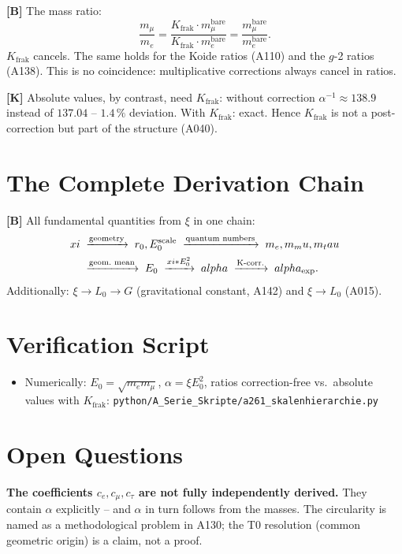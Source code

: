 \textbf{[B]} The mass ratio:
\[
  \frac{m_\mu}{m_e}
  = \frac{K_\text{frak}\cdot m_\mu^\text{bare}}{K_\text{frak}\cdot m_e^\text{bare}}
  = \frac{m_\mu^\text{bare}}{m_e^\text{bare}}.
\]
$K_\text{frak}$ cancels. The same holds for the Koide ratios (A110) and the
$g$-2 ratios (A138). This is no coincidence: multiplicative corrections always
cancel in ratios.

\textbf{[K]} Absolute values, by contrast, need $K_\text{frak}$: without
correction $\alpha^{-1}\approx138{.}9$ instead of $137{.}04$ -- $1{.}4\,\%$
deviation. With $K_\text{frak}$: exact. Hence $K_\text{frak}$ is not a
post-correction but part of the structure (A040).

\section{The Complete Derivation Chain}

\textbf{[B]} All fundamental quantities from $\xi$ in one chain:
\begin{align}
  \xi &\;\xrightarrow{\text{geometry}}\; r_0,E_0^\text{scale}
       \;\xrightarrow{\text{quantum numbers}}\; m_e,m_\mu,m_\tau \notag\\
      &\;\xrightarrow{\text{geom.\ mean}}\; E_0
       \;\xrightarrow{\xi\cdot E_0^2}\; \alpha
       \;\xrightarrow{\text{K-corr.}}\; \alpha_\text{exp}. \notag
\end{align}
Additionally: $\xi\to L_0\to G$ (gravitational constant, A142) and $\xi\to L_0$ (A015).

\section{Verification Script}

\begin{itemize}[leftmargin=2em,itemsep=2pt,topsep=2pt]
  \item Numerically: $E_0=\sqrt{m_em_\mu}$, $\alpha=\xi E_0^2$, ratios
    correction-free vs.\ absolute values with $K_\text{frak}$:
    \texttt{python/A\_Serie\_Skripte/a261\_skalenhierarchie.py}
\end{itemize}

\section{Open Questions}

\textbf{The coefficients $c_e,c_\mu,c_\tau$ are not fully independently derived.}
They contain $\alpha$ explicitly -- and $\alpha$ in turn follows from the masses.
The circularity is named as a methodological problem in A130; the T0 resolution
(common geometric origin) is a claim, not a proof.

